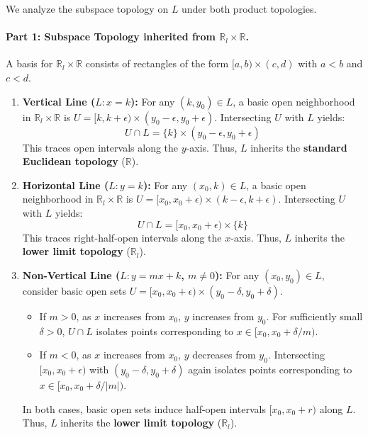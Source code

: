 
We analyze the subspace topology on $L$ under both product topologies.

\paragraph{Part 1: Subspace Topology inherited from $\mathbb{R}_l\times\mathbb{R}$.}
A basis for $\mathbb{R}_l\times\mathbb{R}$ consists of rectangles of the form
$[a,b)\times(c,d)$ with $a<b$ and $c<d$.

\begin{enumerate}[label=(\alph*)]
  \item \textbf{Vertical Line ($L: x=k$):}
    For any $(k,y_0)\in L$, a basic open neighborhood in $\mathbb{R}_l\times\mathbb{R}$ is
    $U=[k,k+\epsilon)\times(y_0-\epsilon,y_0+\epsilon)$. Intersecting $U$ with $L$ yields:
    \[ U\cap L=\{k\}\times(y_0-\epsilon,y_0+\epsilon) \]
    This traces open intervals along the $y$-axis. Thus, $L$ inherits the
    \textbf{standard Euclidean topology} ($\mathbb{R}$).

  \item \textbf{Horizontal Line ($L: y=k$):}
    For any $(x_0,k)\in L$, a basic open neighborhood in $\mathbb{R}_l\times\mathbb{R}$ is
    $U=[x_0,x_0+\epsilon)\times(k-\epsilon,k+\epsilon)$. Intersecting $U$ with $L$ yields:
    \[ U\cap L=[x_0,x_0+\epsilon)\times\{k\} \]
    This traces right-half-open intervals along the $x$-axis. Thus, $L$ inherits the
    \textbf{lower limit topology} ($\mathbb{R}_l$).

  \item \textbf{Non-Vertical Line ($L: y=mx+k$, $m\neq0$):}
    For any $(x_0,y_0)\in L$, consider basic open sets
    $U=[x_0,x_0+\epsilon)\times(y_0-\delta,y_0+\delta)$.
    \begin{itemize}
      \item If $m>0$, as $x$ increases from $x_0$, $y$ increases from $y_0$. For sufficiently
            small $\delta>0$, $U\cap L$ isolates points corresponding to
            $x\in[x_0,x_0+\delta/m)$.
      \item If $m<0$, as $x$ increases from $x_0$, $y$ decreases from $y_0$. Intersecting
            $[x_0,x_0+\epsilon)$ with $(y_0-\delta,y_0+\delta)$ again isolates points
            corresponding to $x\in[x_0,x_0+\delta/|m|)$.
    \end{itemize}
    In both cases, basic open sets induce half-open intervals $[x_0,x_0+r)$ along $L$. Thus,
    $L$ inherits the \textbf{lower limit topology} ($\mathbb{R}_l$).
\end{enumerate}

